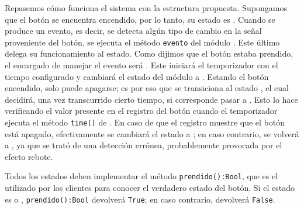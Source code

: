 \begin{figure}[H]
\begin{center}
{
}
\end{center}
\end{figure}


Repasemos cómo funciona el sistema con la estructura propuesta. Supongamos que el botón se encuentra encendido, por lo tanto, su estado es \On. Cuando se produce un evento, es decir, se detecta algún tipo de cambio en la señal proveniente del botón, se ejecuta el método \verb|evento| del módulo \Boton. Este último delega su funcionamiento al estado. Como dijimos que el botón estaba prendido, el encargado de manejar el evento será \On. Este iniciará el temporizador con el tiempo configurado y cambiará el estado del módulo \Boton a \WaitOff. Estando el botón encendido, solo puede apagarse; es por eso que se transiciona al estado \WaitOff, el cual decidirá, una vez transcurrido cierto tiempo, si corresponde pasar a \Off. Esto lo hace verificando el valor presente en el registro del botón cuando el temporizador ejecuta el método \verb|time()| de \Boton. En caso de que el registro muestre que el botón está apagado, efectivamente se cambiará el estado a \Off; en caso contrario, se volverá a \On, ya que se trató de una detección errónea, probablemente provocada por el efecto rebote. 

Todos los estados deben implementar el método \verb|prendido():Bool|, que es el utilizado por los clientes para conocer el verdadero estado del botón. Si el estado es \On o \WaitOff, \verb|prendido():Bool| devolverá \verb|True|; en caso contrario, devolverá \verb|False|.



